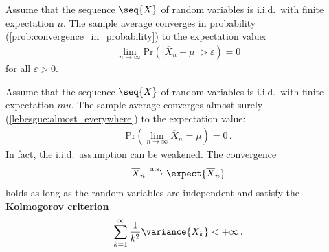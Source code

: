     \begin{theorem}
        Assume that the sequence $\seq{X}$ of random variables is i.i.d.~with finite expectation $\mu$. The sample average converges in probability (\cref{prob:convergence_in_probability}) to the expectation value:
        \begin{gather}
            \lim_{n\rightarrow\infty}\mathrm{Pr}\left(|\overline{X}_n-\mu|>\varepsilon\right)=0
        \end{gather}
        for all $\varepsilon>0$.
    \end{theorem}
    \begin{theorem}\label{prob:strong_lln}
        Assume that the sequence $\seq{X}$ of random variables is i.i.d.~with finite expectation $mu$. The sample average converges almost surely (\cref{lebesgue:almost_everywhere}) to the expectation value:
        \begin{gather}
            \mathrm{Pr}\left(\lim_{n\rightarrow\infty}\overline{X}_n=\mu\right)=0\,.
        \end{gather}
        In fact, the i.i.d.~assumption can be weakened. The convergence
        \begin{gather}
            \overline{X}_n\overset{\text{a.s.}}{\longrightarrow}\expect{\overline{X}_n}
        \end{gather}
        holds as long as the random variables are independent and satisfy the \textbf{Kolmogorov criterion}
        \begin{gather}
            \sum_{k=1}^\infty\frac{1}{k^2}\variance{X_k}<+\infty\,.
        \end{gather}
    \end{theorem}


